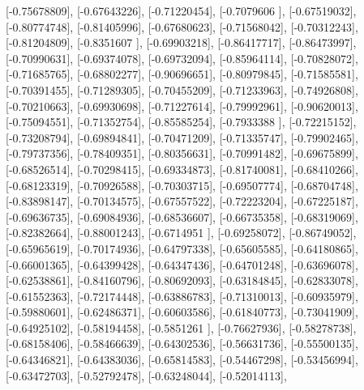 \documentclass{article}
\begin{document}
       [-0.75678809],
       [-0.67643226],
       [-0.71220454],
       [-0.7079606 ],
       [-0.67519032],
       [-0.80774748],
       [-0.81405996],
       [-0.67680623],
       [-0.71568042],
       [-0.70312243],
       [-0.81204809],
       [-0.8351607 ],
       [-0.69903218],
       [-0.86417717],
       [-0.86473997],
       [-0.70990631],
       [-0.69374078],
       [-0.69732094],
       [-0.85964114],
       [-0.70828072],
       [-0.71685765],
       [-0.68802277],
       [-0.90696651],
       [-0.80979845],
       [-0.71585581],
       [-0.70391455],
       [-0.71289305],
       [-0.70455209],
       [-0.71233963],
       [-0.74926808],
       [-0.70210663],
       [-0.69930698],
       [-0.71227614],
       [-0.79992961],
       [-0.90620013],
       [-0.75094551],
       [-0.71352754],
       [-0.85585254],
       [-0.7933388 ],
       [-0.72215152],
       [-0.73208794],
       [-0.69894841],
       [-0.70471209],
       [-0.71335747],
       [-0.79902465],
       [-0.79737356],
       [-0.78409351],
       [-0.80356631],
       [-0.70991482],
       [-0.69675899],
       [-0.68526514],
       [-0.70298415],
       [-0.69334873],
       [-0.81740081],
       [-0.68410266],
       [-0.68123319],
       [-0.70926588],
       [-0.70303715],
       [-0.69507774],
       [-0.68704748],
       [-0.83898147],
       [-0.70134575],
       [-0.67557522],
       [-0.72223204],
       [-0.67225187],
       [-0.69636735],
       [-0.69084936],
       [-0.68536607],
       [-0.66735358],
       [-0.68319069],
       [-0.82382664],
       [-0.88001243],
       [-0.6714951 ],
       [-0.69258072],
       [-0.86749052],
       [-0.65965619],
       [-0.70174936],
       [-0.64797338],
       [-0.65605585],
       [-0.64180865],
       [-0.66001365],
       [-0.64399428],
       [-0.64347436],
       [-0.64701248],
       [-0.63696078],
       [-0.62538861],
       [-0.84160796],
       [-0.80692093],
       [-0.63184845],
       [-0.62833078],
       [-0.61552363],
       [-0.72174448],
       [-0.63886783],
       [-0.71310013],
       [-0.60935979],
       [-0.59880601],
       [-0.62486371],
       [-0.60603586],
       [-0.61840773],
       [-0.73041909],
       [-0.64925102],
       [-0.58194458],
       [-0.5851261 ],
       [-0.76627936],
       [-0.58278738],
       [-0.68158406],
       [-0.58466639],
       [-0.64302536],
       [-0.56631736],
       [-0.55500135],
       [-0.64346821],
       [-0.64383036],
       [-0.65814583],
       [-0.54467298],
       [-0.53456994],
       [-0.63472703],
       [-0.52792478],
       [-0.63248044],
       [-0.52014113],
\end{document}

